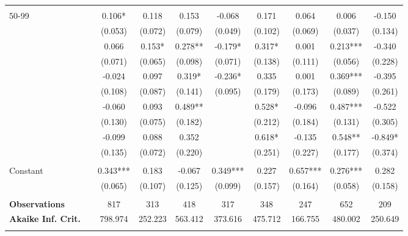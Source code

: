 \begin{tabular*}{\linewidth}{@{\extracolsep{\fill} } llcccccccc}
&&&&&&&&&\\%
\multirow{2}{*}{\hspace{0.2cm}50{-}99}&&0.106*&0.118&0.153&{-}0.068&0.171&0.064&0.006&{-}0.150\\%
&&(0.053)&(0.072)&(0.079)&(0.049)&(0.102)&(0.069)&(0.037)&(0.134)\\%
\arrayrulecolor{white}%
\hline%
\arrayrulecolor{white}%
\hline%
\arrayrulecolor{white}%
\hline%
\arrayrulecolor{white}%
\hline%
\arrayrulecolor{white}%
\hline%
\multirow{2}{*}{\hspace{0.2cm}100{-}199}&&0.066&0.153*&0.278**&{-}0.179*&0.317*&0.001&0.213***&{-}0.340\\%
&&(0.071)&(0.065)&(0.098)&(0.071)&(0.138)&(0.111)&(0.056)&(0.228)\\%
\arrayrulecolor{white}%
\hline%
\arrayrulecolor{white}%
\hline%
\arrayrulecolor{white}%
\hline%
\arrayrulecolor{white}%
\hline%
\arrayrulecolor{white}%
\hline%
\multirow{2}{*}{\hspace{0.2cm}200{-}299}&&{-}0.024&0.097&0.319*&{-}0.236*&0.335&0.001&0.369***&{-}0.395\\%
&&(0.108)&(0.087)&(0.141)&(0.095)&(0.179)&(0.173)&(0.089)&(0.261)\\%
\arrayrulecolor{white}%
\hline%
\arrayrulecolor{white}%
\hline%
\arrayrulecolor{white}%
\hline%
\arrayrulecolor{white}%
\hline%
\arrayrulecolor{white}%
\hline%
\multirow{2}{*}{\hspace{0.2cm}300{-}399}&&{-}0.060&0.093&0.489**&&0.528*&{-}0.096&0.487***&{-}0.522\\%
&&(0.130)&(0.075)&(0.182)&&(0.212)&(0.184)&(0.131)&(0.305)\\%
\arrayrulecolor{white}%
\hline%
\arrayrulecolor{white}%
\hline%
\arrayrulecolor{white}%
\hline%
\arrayrulecolor{white}%
\hline%
\arrayrulecolor{white}%
\hline%
\multirow{2}{*}{\hspace{0.2cm}400+}&&{-}0.099&0.088&0.352&&0.618*&{-}0.135&0.548**&{-}0.849*\\%
&&(0.135)&(0.072)&(0.220)&&(0.251)&(0.227)&(0.177)&(0.374)\\%
\arrayrulecolor{white}%
\hline%
\arrayrulecolor{white}%
\hline%
\arrayrulecolor{white}%
\hline%
\arrayrulecolor{white}%
\hline%
\arrayrulecolor{white}%
\hline%
&&&&&&&&&\\%
\multirow{2}{*}{Constant}&&0.343***&0.183&{-}0.067&0.349***&0.227&0.657***&0.276***&0.282\\%
&&(0.065)&(0.107)&(0.125)&(0.099)&(0.157)&(0.164)&(0.058)&(0.158)\\%
\arrayrulecolor{white}%
\hline%
\arrayrulecolor{white}%
\hline%
\arrayrulecolor{white}%
\hline%
\arrayrulecolor{white}%
\hline%
\arrayrulecolor{white}%
\hline%
&&&&&&&&&\\%
\bfseries Observations&&817&313&418&317&348&247&652&209\\%
\bfseries Akaike Inf. Crit.&&798.974&252.223&563.412&373.616&475.712&166.755&480.002&250.649\\%
\arrayrulecolor{white}%
\hline%
\arrayrulecolor{white}%
\hline%
\arrayrulecolor{white}%
\hline%
\arrayrulecolor{white}%
\hline%
\arrayrulecolor{white}%
\hline%
\arrayrulecolor{black}%
\hline%
\end{tabular*}
